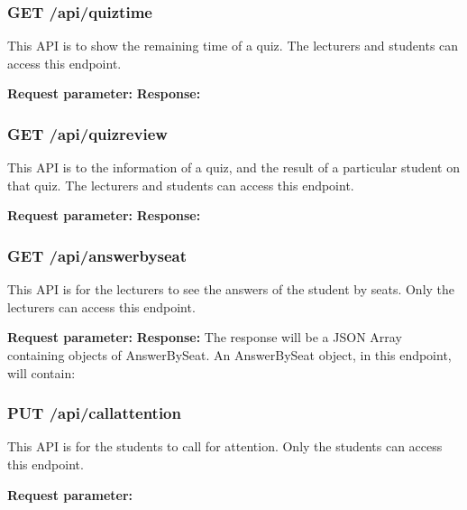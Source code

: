 \documentclass[a4paper, 11pt,openany]{book} %
\begin{document}
\subsubsection{GET /api/quiztime}
This API is to show the remaining time of a quiz. The lecturers and students can access this endpoint. \par
\textbf{Request parameter:}
\textbf{Response:}

\subsubsection{GET /api/quizreview}
This API is to the information of a quiz, and the result of a particular student on that quiz. The lecturers and students can access this endpoint. \par
\textbf{Request parameter:}
\textbf{Response:}
\subsubsection{GET /api/answerbyseat}
This API is for the lecturers to see the answers of the student by seats. Only the lecturers can access this endpoint. \par
\textbf{Request parameter:}
\textbf{Response:}
The response will be a JSON Array containing objects of AnswerBySeat. An AnswerBySeat object, in this endpoint, will contain:

\subsubsection{PUT /api/callattention}
This API is for the students to call for attention. Only the students can access this endpoint. \par
\textbf{Request parameter:}
\end{document}
